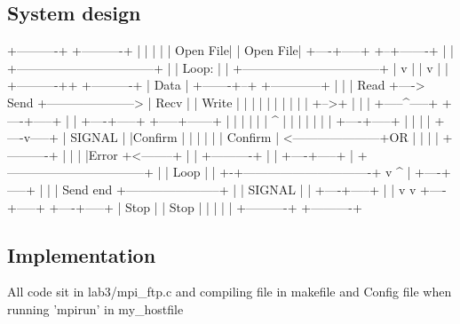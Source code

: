 \documentclass{article}
\begin{document}
\subsection{System design}
         +----------+                                       +----------+
         |          |                                       |          |
         | Open File|                                       | Open File|
         +----+-----+                                       +--+-------+
              |                                                |
+---------------------------------+                            |
| Loop:       |                   |                  +---------------------------------+
|             v                   |                  |         v                       |
|  +----------++    +----------+  |     Data         | +-------+--+   +------------+   |
|  | Read      +----> Send     +---------------------> | Recv     |   |  Write     |   |
|  |           |    |          |  |                  | |          +-->+            |   |
|  +-----^-----+    +----+-----+  |                  | +----+-----+   +-----+------+   |
|        |               |        |                  |      ^               |          |
|        |               |        |                  | +----+-----+         |          |
|        |          +----v-----+  |    SIGNAL        | |Confirm   |         |          |
|        |          | Confirm  | <---------------------+OR        |         |          |
|        +----------+          |  |                  | |Error     +<--------+          |
|                   +----------+  |                  | +----+-----+                    |
+---------------------------------+                  |      |                 Loop     |
                         |                           +-+-------------------------------+
                         v                             ^    |
                    +----+-----+                       |    |
                    | Send end +-----------------------+    |
                    | SIGNAL   |                            |
                    +----+-----+                            |
                         |                                  v
                         v                             +----+-----+
                    +----+-----+                       | Stop     |
                    | Stop     |                       |          |
                    |          |                       +----------+
                    +----------+

\subsection{Implementation}
All code sit in lab3/mpi_ftp.c 
and 
compiling file in makefile
and
Config file when running 'mpirun' in my_hostfile
\end{document}
